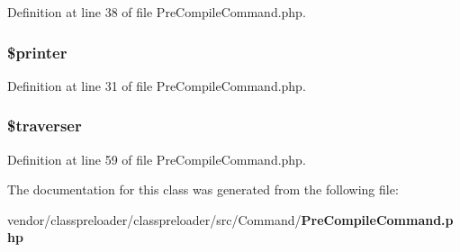 Definition at line 38 of file Pre\+Compile\+Command.\+php.

\subsubsection[{\$printer}]{\setlength{\rightskip}{0pt plus 5cm}\$printer\hspace{0.3cm}{\ttfamily [protected]}}\label{class_class_preloader_1_1_command_1_1_pre_compile_command_a8f1a1a1e302df6070d50a8b8f6d7a0f0}


Definition at line 31 of file Pre\+Compile\+Command.\+php.

\subsubsection[{\$traverser}]{\setlength{\rightskip}{0pt plus 5cm}\$traverser\hspace{0.3cm}{\ttfamily [protected]}}\label{class_class_preloader_1_1_command_1_1_pre_compile_command_ae6725770c4bf11723bd3586bc0699c82}


Definition at line 59 of file Pre\+Compile\+Command.\+php.



The documentation for this class was generated from the following file\+:\begin{DoxyCompactItemize}
\item 
vendor/classpreloader/classpreloader/src/\+Command/{\bf Pre\+Compile\+Command.\+php}\end{DoxyCompactItemize}
